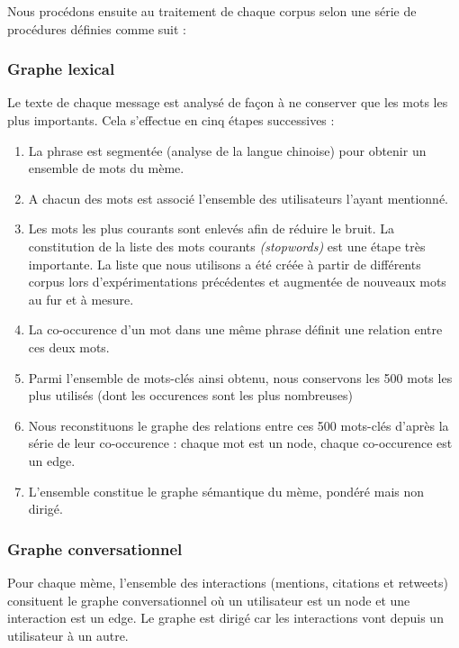 Nous procédons ensuite au traitement de chaque corpus selon une
série de procédures définies comme suit :

\subsubsection{Graphe lexical}

Le texte de chaque message est analysé de fa\c{c}on à ne conserver
que les mots les plus importants. Cela s{\textquoteright}effectue en
cinq étapes successives : 

\begin{enumerate}
\item La phrase est segmentée (analyse de la langue chinoise) pour
obtenir un ensemble de mots du mème.
\item A chacun des mots est associé l{\textquoteright}ensemble des
utilisateurs l{\textquoteright}ayant mentionné.
\item Les mots les plus courants sont enlevés afin de réduire le
bruit. La constitution de la liste des mots courants
\textit{(stopwords) }est une étape très importante. La liste que
nous utilisons a été créée à partir de différents corpus
lors d{\textquoteright}expérimentations précédentes et
augmentée de nouveaux mots au fur et à mesure.
\item La co-occurence d{\textquoteright}un mot dans une m\^eme phrase
définit une relation entre ces deux mots.
\item Parmi l{\textquoteright}ensemble de mots-clés ainsi obtenu, nous
conservons les 500 mots les plus utilisés (dont les occurences sont
les plus nombreuses) 
\item Nous reconstituons le graphe des relations entre ces 500
mots-clés d{\textquoteright}après la série de leur co-occurence :
chaque mot est un node, chaque co-occurence est un edge.
\item L{\textquoteright}ensemble constitue le graphe sémantique du
mème, pondéré mais non dirigé.
\end{enumerate}

\subsubsection{Graphe conversationnel}

Pour chaque mème, l{\textquoteright}ensemble des interactions
(mentions, citations et retweets) consituent le graphe conversationnel
o\`u un utilisateur est un node et une interaction est un edge. Le
graphe est dirigé car les interactions vont depuis un utilisateur à
un autre. 

